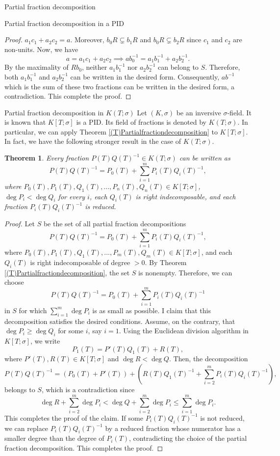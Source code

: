 \documentclass[11pt,a4paper]{article}
\theoremstyle{theorem}
\newtheorem{theorem}{Theorem}[section]
\numberwithin{equation}{section}
\newcommand{\s}{\sigma}
\begin{document}
\begin{section}{Partial fraction decomposition}
\begin{subsection}{Partial fraction decomposition in a PID}
\begin{proof}
			$a_1c_1+a_2c_2=a$. Moreover, $b_0R\subsetneq b_1R$ and $b_0R\subsetneq b_2R$ since $c_1$ and $c_2$ are non-units.  Now, we have
			$$a=a_1c_1+a_2c_2\implies ab_0^{-1}=a_1b_1^{-1}+a_2b_2^{-1}.$$
			By the maximality of $Rb_0$, neither $a_1b_1^{-1}$ nor $a_2b_2^{-1}$ can belong to $ S$.  Therefore, both $a_1b_1^{-1}$ and $a_2b_2^{-1}$ can be written in the desired form. Consequently, $ab^{-1}$ which is the sum of these two fractions can be written in the desired form, a contradiction. This complete the proof. 
		\end{proof}
		
	\end{subsection}
	
	\begin{subsection}{Partial fraction decomposition in $K(T;\sigma)$}
		Let $(K,\s)$ be an inversive $\s$-field. It is known that $K[T;\sigma]$ is a PID. Its field of fractions is denoted by $K(T;\s)$. In particular, we can apply Theorem \ref{(T)Partialfractiondecomposition} to $K[T;\sigma]$. In fact, we have the following stronger result in the case of $K(T;\s)$.
		\begin{theorem}\label{(T)Partialfractiondecompositioninsigmafields}
			Every fraction $P(T)Q(T)^{-1}\in K(T;\s)$ can be written as
			$$P(T)Q(T)^{-1}=P_0(T)+\sum_{i=1}^m P_i(T)Q_i(T)^{-1},$$
			where $P_0(T),P_1(T),Q_1(T),...,P_n(T),Q_n(T)\in K[T;\sigma]$, $\deg P_i<\deg Q_i$ for every $i$, each $Q_i(T)$ is right indecomposable, and each fraction $P_i(T)Q_i(T)^{-1}$ is reduced. 
		\end{theorem}
		\begin{proof}	
			Let $S$ be the set of all partial fraction decompositions
				$$P(T)Q(T)^{-1}=P_0(T)+\sum_{i=1}^m P_i(T)Q_i(T)^{-1},$$
			where $P_0(T),P_1(T),Q_1(T),...,P_m(T),Q_m(T)\in K[T;\sigma]$,  and each $Q_i(T)$ is right indecomposable of degree $>0$.
			By Theorem \ref{(T)Partialfractiondecomposition}, the set $S$ is nonempty. Therefore, we can choose $$P(T)Q(T)^{-1}=P_0(T)+\sum_{i=1}^m P_i(T)Q_i(T)^{-1}$$
			in $S$ for which $\sum_{i=1}^m\deg P_i$ is as small as possible. I claim that this decomposition satisfies the desired conditions. Assume, on the contrary, that $\deg P_i\geq \deg Q_i$ for some $i$, say $i=1$. 
			Using the Euclidean division algorithm in $K[T;\sigma]$, we write  
			$$P_1(T)=P'(T)Q_1(T)+R(T),$$
			where $P'(T),R(T)\in K[T;\sigma]$ and $\deg R<\deg Q.$ 
			Then, the decomposition 
			$$P(T)Q(T)^{-1}=\left( P_0(T)+P'(T)\right) +\left( R(T)Q_1(T)^{-1}+\sum_{i=2}^m P_i(T)Q_i(T)^{-1}\right) ,$$ belongs to $S$, which is a contradiction since 
			$$\deg R+\sum_{i=2}^m\deg P_i<\deg Q+\sum_{i=2}^m\deg P_i\leq \sum_{i=1}^m\deg P_i.$$
			 This completes the proof of the claim. If some $P_i(T)Q_i(T)^{-1}$ is not reduced, we can replace $P_i(T)Q_i(T)^{-1}$ by a reduced fraction whose numerator has a smaller degree than the degree of $P_i(T)$, contradicting the choice of the partial fraction decomposition. This completes the proof. 			 
		\end{proof}	


\end{subsection}
\end{section}
\end{document}
